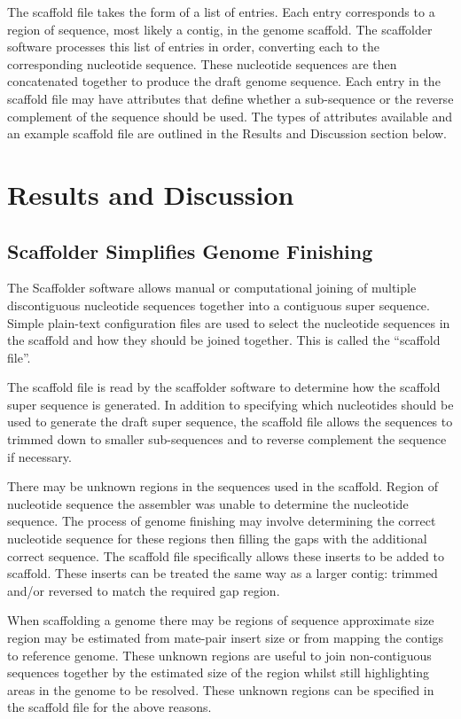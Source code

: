 \documentclass[10pt]{bmc_article}
\newenvironment{bmcformat}{\begin{raggedright}\baselineskip20pt\sloppy\setboolean{publ}{false}}{\end{raggedright}\baselineskip20pt\sloppy}
\begin{document}
\begin{bmcformat}
The scaffold file takes the form of a list of entries. Each entry corresponds
to a region of sequence, most likely a contig, in the genome scaffold. The
scaffolder software processes this list of entries in order, converting each to
the corresponding nucleotide sequence. These nucleotide sequences are then
concatenated together to produce the draft genome sequence. Each entry in the
scaffold file may have attributes that define whether a sub-sequence or the
reverse complement of the sequence should be used. The types of attributes
available and an example scaffold file are outlined in the Results and
Discussion section below.  \pb

\clearpage

\section*{Results and Discussion} %

\subsection*{Scaffolder Simplifies Genome Finishing} %

The Scaffolder software allows manual or computational joining of multiple
discontiguous nucleotide sequences together into a contiguous super sequence.
Simple plain-text configuration files are used to select the nucleotide
sequences in the scaffold and how they should be joined together. This is
called the ``scaffold file''. \pb

The scaffold file is read by the scaffolder software to determine how the
scaffold super sequence is generated. In addition to specifying which
nucleotides should be used to generate the draft super sequence, the scaffold
file allows the sequences to trimmed down to smaller sub-sequences and to
reverse complement the sequence if necessary. \pb

There may be unknown regions in the sequences used in the scaffold. Region of
nucleotide sequence the assembler was unable to determine the nucleotide
sequence. The process of genome finishing may involve determining the correct
nucleotide sequence for these regions then filling the gaps with the additional
correct sequence. The scaffold file specifically allows these inserts to be
added to scaffold. These inserts can be treated the same way as a larger
contig: trimmed and/or reversed to match the required gap region. \pb

When scaffolding a genome there may be regions of sequence approximate size
region may be estimated from mate-pair insert size or from mapping the contigs
to reference genome. These unknown regions are useful to join non-contiguous
sequences together by the estimated size of the region whilst still
highlighting areas in the genome to be resolved. These unknown regions can be
specified in the scaffold file for the above reasons. \pb


\end{bmcformat}
\end{document}

